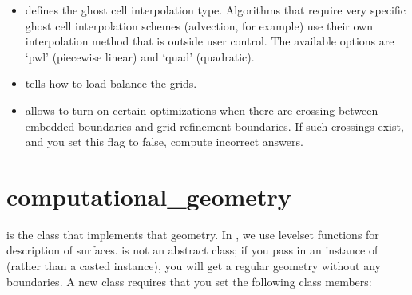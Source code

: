 \documentclass[letterpaper,10pt,english]{sphinxmanual}
\begin{document}
\begin{itemize}
\item {} 
 defines the ghost cell interpolation type. Algorithms that require very specific ghost cell interpolation schemes (advection, for example) use their own interpolation method that is outside user control. The available options are ‘pwl’ (piecewise linear) and ‘quad’ (quadratic).

\item {} 
 tells  how to load balance the grids.

\item {} 
 allows  to turn on certain optimizations when there are  crossing between embedded boundaries and grid refinement boundaries. If such crossings exist, and you set this flag to false,   compute incorrect answers.

\end{itemize}


\section{computational\_geometry}
\label{\detokenize{ComputationalGeometry:computational-geometry}}\label{\detokenize{ComputationalGeometry:chap-computational-geometry}}\label{\detokenize{ComputationalGeometry::doc}}
{\hyperref[\detokenize{ComputationalGeometry:chap-computational-geometry}]{}} is the class that implements that geometry.
In , we use level\sphinxhyphen{}set functions for description of surfaces. {\hyperref[\detokenize{ComputationalGeometry:chap-computational-geometry}]{}} is not an abstract class;
if you pass in an instance of {\hyperref[\detokenize{ComputationalGeometry:chap-computational-geometry}]{}} (rather than a casted instance), you will get a regular geometry without any boundaries.
A new {\hyperref[\detokenize{ComputationalGeometry:chap-computational-geometry}]{}} class requires that you set the following class members:

\begin{sphinxVerbatim}[commandchars=\\\{\},formatcom=\scriptsize]
 
 
 
\end{sphinxVerbatim}
\end{document}
